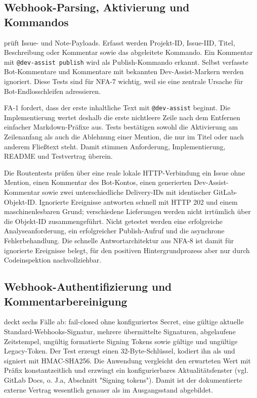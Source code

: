 \subsection{Webhook-Parsing, Aktivierung und Kommandos}

 prüft Issue- und Note-Payloads. Erfasst werden Projekt-ID, Issue-IID, Titel, Beschreibung oder Kommentar sowie das abgeleitete Kommando. Ein Kommentar mit \texttt{@dev-assist publish} wird als Publish-Kommando erkannt. Selbst verfasste Bot-Kommentare und Kommentare mit bekannten Dev-Assist-Markern werden ignoriert. Diese Tests sind für NFA-7 wichtig, weil sie eine zentrale Ursache für Bot-Endlosschleifen adressieren.

FA-1 fordert, dass der erste inhaltliche Text mit \texttt{@dev-assist} beginnt. Die Implementierung wertet deshalb die erste nichtleere Zeile nach dem Entfernen einfacher Markdown-Präfixe aus. Tests bestätigen sowohl die Aktivierung am Zeilenanfang als auch die Ablehnung einer Mention, die nur im Titel oder nach anderem Fließtext steht. Damit stimmen Anforderung, Implementierung, README und Testvertrag überein.

Die Routentests prüfen über eine reale lokale HTTP-Verbindung ein Issue ohne Mention, einen Kommentar des Bot-Kontos, einen generierten Dev-Assist-Kommentar sowie zwei unterschiedliche Delivery-IDs mit identischer GitLab-Objekt-ID. Ignorierte Ereignisse antworten schnell mit HTTP 202 und einem maschinenlesbaren Grund; verschiedene Lieferungen werden nicht irrtümlich über die Objekt-ID zusammengeführt. Nicht getestet werden eine erfolgreiche Analyseanforderung, ein erfolgreicher Publish-Aufruf und die asynchrone Fehlerbehandlung. Die schnelle Antwortarchitektur aus NFA-8 ist damit für ignorierte Ereignisse belegt, für den positiven Hintergrundprozess aber nur durch Codeinspektion nachvollziehbar.

\subsection{Webhook-Authentifizierung und Kommentarbereinigung}

 deckt sechs Fälle ab: fail-closed ohne konfiguriertes Secret, eine gültige aktuelle Standard-Webhooks-Signatur, mehrere übermittelte Signaturen, abgelaufene Zeitstempel, ungültig formatierte Signing Tokens sowie gültige und ungültige Legacy-Token. Der Test erzeugt einen 32-Byte-Schlüssel, kodiert ihn als  und signiert  mit HMAC-SHA256. Die Anwendung vergleicht den erwarteten Wert mit Präfix  konstantzeitlich und erzwingt ein konfigurierbares Aktualitätsfenster (vgl. GitLab Docs, o. J.a, Abschnitt "Signing tokens"). Damit ist der dokumentierte externe Vertrag wesentlich genauer als im Ausgangsstand abgebildet.

